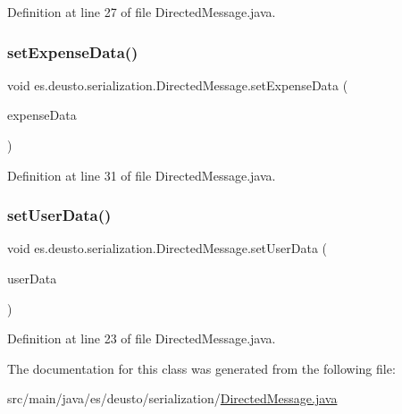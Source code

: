 Definition at line 27 of file Directed\+Message.\+java.

\mbox{\label{classes_1_1deusto_1_1serialization_1_1_directed_message_a2f339d3849855fd1fc88cdf6a6c3e2cf}} 
\subsubsection{\texorpdfstring{set\+Expense\+Data()}{setExpenseData()}}
{\footnotesize\ttfamily void es.\+deusto.\+serialization.\+Directed\+Message.\+set\+Expense\+Data (\begin{DoxyParamCaption}\item[{\hyperlink{classes_1_1deusto_1_1serialization_1_1_expense_data}{Expense\+Data}}]{expense\+Data }\end{DoxyParamCaption})}



Definition at line 31 of file Directed\+Message.\+java.

\mbox{\label{classes_1_1deusto_1_1serialization_1_1_directed_message_a4a3f7852410bc29d73179294836e84c4}} 
\subsubsection{\texorpdfstring{set\+User\+Data()}{setUserData()}}
{\footnotesize\ttfamily void es.\+deusto.\+serialization.\+Directed\+Message.\+set\+User\+Data (\begin{DoxyParamCaption}\item[{\hyperlink{classes_1_1deusto_1_1serialization_1_1_user_data}{User\+Data}}]{user\+Data }\end{DoxyParamCaption})}



Definition at line 23 of file Directed\+Message.\+java.



The documentation for this class was generated from the following file\+:\begin{DoxyCompactItemize}
\item 
src/main/java/es/deusto/serialization/\hyperlink{_directed_message_8java}{Directed\+Message.\+java}\end{DoxyCompactItemize}

